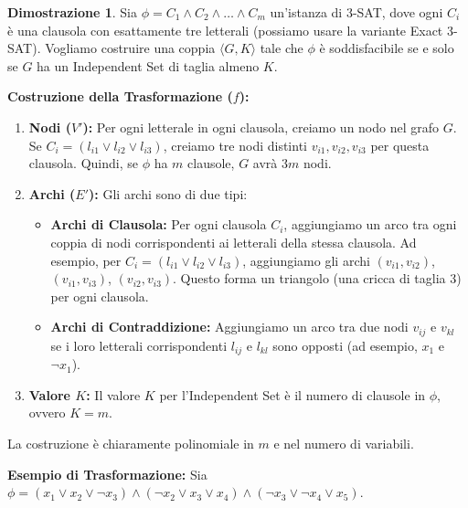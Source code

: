 \documentclass[a4paper, 11pt]{book} %
\theoremstyle{definition}
\newtheorem*{proof*}{Dimostrazione}
\begin{document}
\begin{proof*}
Sia $\phi = C_1 \land C_2 \land \dots \land C_m$ un'istanza di 3-SAT, dove ogni $C_i$ è una clausola con esattamente tre letterali (possiamo usare la variante Exact 3-SAT). Vogliamo costruire una coppia $\langle G, K \rangle$ tale che $\phi$ è soddisfacibile se e solo se $G$ ha un Independent Set di taglia almeno $K$.

\textbf{Costruzione della Trasformazione ($f$):}
\begin{enumerate}
    \item \textbf{Nodi ($V'$):} Per ogni letterale in ogni clausola, creiamo un nodo nel grafo $G$. Se $C_i = (l_{i1} \lor l_{i2} \lor l_{i3})$, creiamo tre nodi distinti $v_{i1}, v_{i2}, v_{i3}$ per questa clausola.
    Quindi, se $\phi$ ha $m$ clausole, $G$ avrà $3m$ nodi.
    \item \textbf{Archi ($E'$):} Gli archi sono di due tipi:
    \begin{itemize}
        \item \textbf{Archi di Clausola:} Per ogni clausola $C_i$, aggiungiamo un arco tra ogni coppia di nodi corrispondenti ai letterali della stessa clausola. Ad esempio, per $C_i = (l_{i1} \lor l_{i2} \lor l_{i3})$, aggiungiamo gli archi $(v_{i1}, v_{i2})$, $(v_{i1}, v_{i3})$, $(v_{i2}, v_{i3})$. Questo forma un triangolo (una cricca di taglia 3) per ogni clausola.
        \item \textbf{Archi di Contraddizione:} Aggiungiamo un arco tra due nodi $v_{ij}$ e $v_{kl}$ se i loro letterali corrispondenti $l_{ij}$ e $l_{kl}$ sono opposti (ad esempio, $x_1$ e $\neg x_1$).
    \end{itemize}
    \item \textbf{Valore $K$:} Il valore $K$ per l'Independent Set è il numero di clausole in $\phi$, ovvero $K=m$.
\end{enumerate}
La costruzione è chiaramente polinomiale in $m$ e nel numero di variabili.

\textbf{Esempio di Trasformazione:}
Sia $\phi = (x_1 \lor x_2 \lor \neg x_3) \land (\neg x_2 \lor x_3 \lor x_4) \land (\neg x_3 \lor \neg x_4 \lor x_5)$.
\begin{figure}[h]
    \centering
\end{figure}
\end{proof*}
\end{document}
